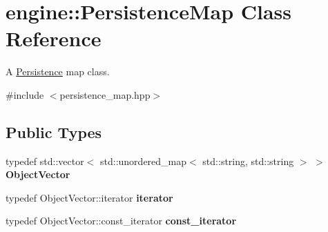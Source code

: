 \hypertarget{classengine_1_1_persistence_map}{}\section{engine\+:\+:Persistence\+Map Class Reference}
\label{classengine_1_1_persistence_map}


A \hyperlink{classengine_1_1_persistence}{Persistence} map class.  




{\ttfamily \#include $<$persistence\+\_\+map.\+hpp$>$}

\subsection*{Public Types}
\begin{DoxyCompactItemize}
\item 
typedef std\+::vector$<$ std\+::unordered\+\_\+map$<$ std\+::string, std\+::string $>$ $>$ {\bfseries Object\+Vector}\hypertarget{classengine_1_1_persistence_map_aa5ba34f0570235795c0e1daa4c97499b}{}\label{classengine_1_1_persistence_map_aa5ba34f0570235795c0e1daa4c97499b}

\item 
typedef Object\+Vector\+::iterator {\bfseries iterator}\hypertarget{classengine_1_1_persistence_map_a94cc5f46bddd5fe4d4f9cc16013c6e4f}{}\label{classengine_1_1_persistence_map_a94cc5f46bddd5fe4d4f9cc16013c6e4f}

\item 
typedef Object\+Vector\+::const\+\_\+iterator {\bfseries const\+\_\+iterator}\hypertarget{classengine_1_1_persistence_map_ac4a64e677fd385c7dd669f235ccfe315}{}\label{classengine_1_1_persistence_map_ac4a64e677fd385c7dd669f235ccfe315}

\end{DoxyCompactItemize}
